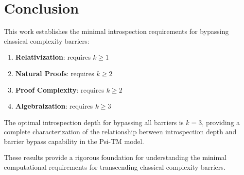 \documentclass[11pt]{article}
\begin{document}
\section{Conclusion}

This work establishes the minimal introspection requirements for bypassing classical complexity barriers:

\begin{enumerate}
\item \textbf{Relativization}: requires $k \geq 1$
\item \textbf{Natural Proofs}: requires $k \geq 2$
\item \textbf{Proof Complexity}: requires $k \geq 2$
\item \textbf{Algebraization}: requires $k \geq 3$
\end{enumerate}

The optimal introspection depth for bypassing all barriers is $k = 3$, providing a complete characterization of the relationship between introspection depth and barrier bypass capability in the Psi-TM model.

These results provide a rigorous foundation for understanding the minimal computational requirements for transcending classical complexity barriers.
\end{document}
